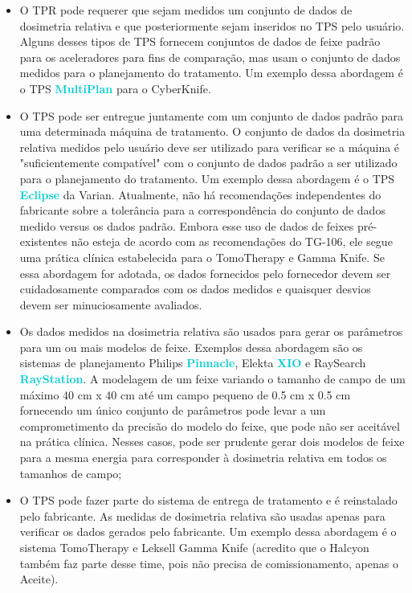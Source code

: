 \documentclass[11pt,a4paper]{article}
\newcounter{exemplo}
\begin{document}
	\begin{itemize}[label=\textcolor{CarnationPink}{$\blacktriangleright$}]
		\item O TPR pode requerer que sejam medidos um conjunto de dados de dosimetria relativa e que posteriormente sejam inseridos no TPS pelo usuário. Alguns desses tipos de TPS fornecem conjuntos de dados de feixe padrão para os aceleradores para fins de comparação, mas usam o conjunto de dados medidos para o planejamento do tratamento. Um exemplo dessa abordagem é o  TPS \textcolor{DarkTurquoise}{\textbf{MultiPlan}}		 para o CyberKnife.
		
		\item O TPS pode ser entregue juntamente com um conjunto de dados padrão para uma determinada máquina de tratamento. O conjunto de dados da dosimetria relativa medidos pelo usuário deve ser utilizado para verificar se a máquina é "suficientemente compatível" com o conjunto de dados padrão a ser utilizado para o planejamento do tratamento. Um exemplo dessa abordagem é o TPS \textcolor{DarkTurquoise}{\textbf{Eclipse}} da Varian. Atualmente, não há recomendações independentes do fabricante sobre a tolerância para a correspondência do conjunto de dados medido versus os dados padrão. Embora esse uso de dados de feixes pré-existentes não esteja de acordo com as recomendações do TG-106, ele segue uma prática clínica estabelecida para o TomoTherapy e Gamma Knife. Se essa abordagem for adotada, os dados fornecidos pelo fornecedor devem ser cuidadosamente comparados com os dados medidos e quaisquer desvios devem ser minuciosamente avaliados.
		
		\item Os dados medidos na dosimetria relativa são usados para gerar os parâmetros para um ou mais modelos de feixe. Exemplos dessa abordagem são os sistemas de planejamento Philips \textcolor{DarkTurquoise}{\textbf{Pinnacle}}, Elekta \textcolor{DarkTurquoise}{\textbf{XIO}} e RaySearch \textcolor{DarkTurquoise}{\textbf{RayStation}}. A modelagem de um feixe variando o tamanho de campo de um máximo 40 cm x 40 cm até um campo pequeno de 0.5 cm x 0.5 cm fornecendo um único conjunto de parâmetros pode levar a um comprometimento da precisão do modelo do feixe, que pode não ser aceitável na prática clínica. Nesses casos, pode ser prudente gerar dois modelos de feixe para a mesma energia  para corresponder à dosimetria relativa em todos os tamanhos de campo;
		
		\item O TPS pode fazer parte do sistema de entrega de tratamento e é reinstalado pelo fabricante. As medidas de dosimetria relativa são usadas apenas para verificar os dados gerados pelo fabricante. Um exemplo dessa abordagem é o sistema TomoTherapy e Leksell Gamma Knife (acredito que o Halcyon também faz parte desse time, pois não precisa de comissionamento, apenas o Aceite).
	\end{itemize}
\end{document}

